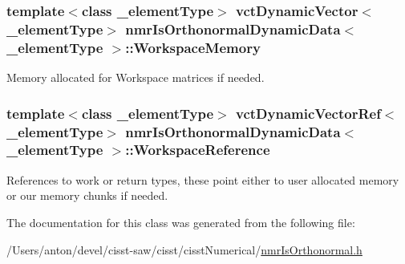 \subsubsection[{Workspace\+Memory}]{\setlength{\rightskip}{0pt plus 5cm}template$<$class \+\_\+element\+Type$>$ {\bf vct\+Dynamic\+Vector}$<$\+\_\+element\+Type$>$ {\bf nmr\+Is\+Orthonormal\+Dynamic\+Data}$<$ \+\_\+element\+Type $>$\+::Workspace\+Memory\hspace{0.3cm}{\ttfamily [protected]}}\label{classnmr_is_orthonormal_dynamic_data_aa64db85fa3c9904a4fb2c917dd171ae6}
Memory allocated for Workspace matrices if needed. \hypertarget{classnmr_is_orthonormal_dynamic_data_a70b7864b872ab20af9400584387f3c21}{}
\subsubsection[{Workspace\+Reference}]{\setlength{\rightskip}{0pt plus 5cm}template$<$class \+\_\+element\+Type$>$ {\bf vct\+Dynamic\+Vector\+Ref}$<$\+\_\+element\+Type$>$ {\bf nmr\+Is\+Orthonormal\+Dynamic\+Data}$<$ \+\_\+element\+Type $>$\+::Workspace\+Reference\hspace{0.3cm}{\ttfamily [protected]}}\label{classnmr_is_orthonormal_dynamic_data_a70b7864b872ab20af9400584387f3c21}
References to work or return types, these point either to user allocated memory or our memory chunks if needed. 

The documentation for this class was generated from the following file\+:\begin{DoxyCompactItemize}
\item 
/\+Users/anton/devel/cisst-\/saw/cisst/cisst\+Numerical/\hyperlink{nmr_is_orthonormal_8h}{nmr\+Is\+Orthonormal.\+h}\end{DoxyCompactItemize}
